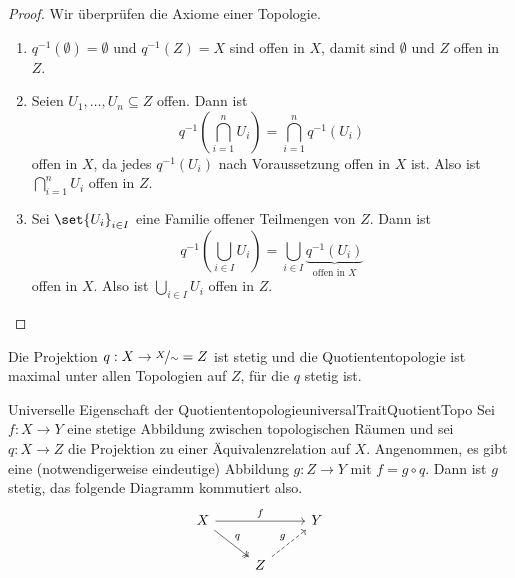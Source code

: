 \documentclass[language=ngerman]{TemplateLecture} %
\begin{document}
\begin{proof}
    Wir überprüfen die Axiome einer Topologie.
    \begin{enumerate}[$(i)$]
        \item $q^{-1}(\emptyset) = \emptyset$ und $q^{-1}(Z) = X$ sind offen in $X$, damit sind $\emptyset$ und $Z$ offen in $Z$.
        \item Seien $U_1, \ldots, U_n \subseteq Z$ offen. Dann ist 
        \begin{equation*}
            q^{-1}\left(\bigcap_{i = 1}^n U_i\right) = \bigcap_{i = 1}^n q^{-1}(U_i)
        \end{equation*}
        offen in $X$, da jedes $q^{-1}(U_i)$ nach Voraussetzung offen in $X$ ist. Also ist $\bigcap_{i = 1}^n U_i$ offen in $Z$.
        \item Sei $\set{U_i}_{i \in I}$ eine Familie offener Teilmengen von $Z$. Dann ist 
        \begin{equation*}
            q^{-1}\left(\bigcup_{i \in I} U_i\right) = \bigcup_{i \in I} \underset{\text{offen in $X$}}{\underbrace{q^{-1}(U_i)}}
        \end{equation*}
        offen in $X$. Also ist $\bigcup_{i \in I} U_i$ offen in $Z$.
    \end{enumerate}
\end{proof}

\begin{remark}
    Die Projektion $q: X \to \nicefrac{X}{\sim} = Z$ ist stetig und die Quotiententopologie ist maximal unter allen Topologien auf $Z$, für die $q$ stetig ist.
\end{remark}

\begin{thm}{Universelle Eigenschaft der Quotiententopologie}{universalTraitQuotientTopo}
    Sei $f: X \to Y$ eine stetige Abbildung zwischen topologischen Räumen und sei $q: X \to Z$ die Projektion zu einer Äquivalenzrelation auf $X$. Angenommen, es gibt eine (notwendigerweise eindeutige) Abbildung $g: Z \to Y$ mit $f = g \circ q$. Dann ist $g$ stetig, das folgende Diagramm kommutiert also. 
    \[
        \begin{tikzcd}
            X \arrow[rr, "f"] \arrow[dr, twoheadrightarrow, "q"]   &                           & Y \\
                                                & Z \arrow[ur, dashed, "g"]
        \end{tikzcd}
    \]
\end{thm}
\end{document}
